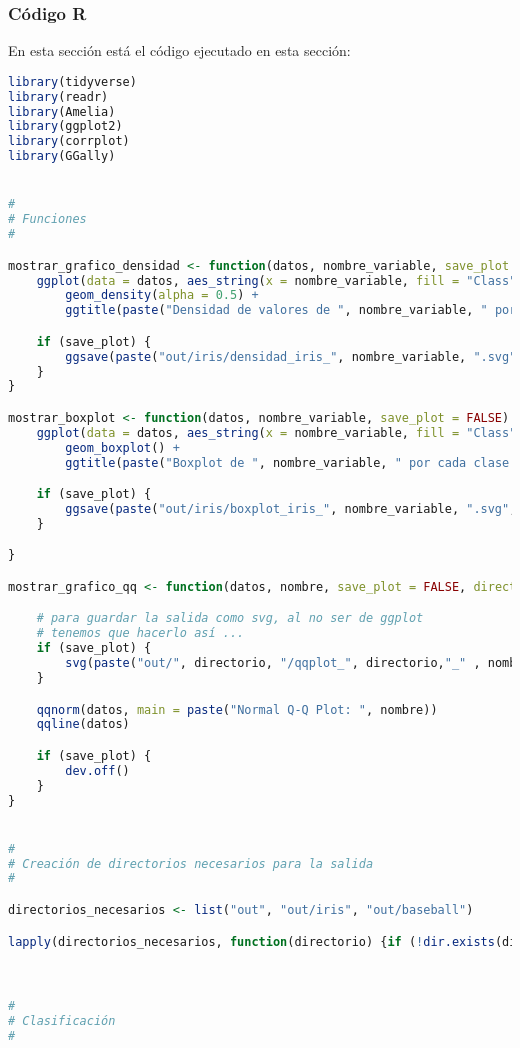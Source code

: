 \subsubsection{Código R}

En esta sección está el código ejecutado en esta sección:

\begin{lstlisting}[language=R]
library(tidyverse)
library(readr)
library(Amelia)
library(ggplot2)
library(corrplot)
library(GGally)


#
# Funciones
#

mostrar_grafico_densidad <- function(datos, nombre_variable, save_plot = FALSE) {
	ggplot(data = datos, aes_string(x = nombre_variable, fill = "Class")) +
		geom_density(alpha = 0.5) +
		ggtitle(paste("Densidad de valores de ", nombre_variable, " por cada clase."))

	if (save_plot) {
		ggsave(paste("out/iris/densidad_iris_", nombre_variable, ".svg", sep = ""), device = svg, width = 1920, height = 1080, units = "px", dpi = 150)
	}
}

mostrar_boxplot <- function(datos, nombre_variable, save_plot = FALSE) {
	ggplot(data = datos, aes_string(x = nombre_variable, fill = "Class")) +
		geom_boxplot() +
		ggtitle(paste("Boxplot de ", nombre_variable, " por cada clase."))

	if (save_plot) {
		ggsave(paste("out/iris/boxplot_iris_", nombre_variable, ".svg", sep = ""), device = svg, width = 1920, height = 1080, units = "px", dpi = 150)
	}

}

mostrar_grafico_qq <- function(datos, nombre, save_plot = FALSE, directorio = "iris") {

	# para guardar la salida como svg, al no ser de ggplot
	# tenemos que hacerlo así ...
	if (save_plot) {
		svg(paste("out/", directorio, "/qqplot_", directorio,"_" , nombre, ".svg", sep = ""))
	}

	qqnorm(datos, main = paste("Normal Q-Q Plot: ", nombre))
	qqline(datos)

	if (save_plot) {
		dev.off()
	}
}


#
# Creación de directorios necesarios para la salida
#

directorios_necesarios <- list("out", "out/iris", "out/baseball")

lapply(directorios_necesarios, function(directorio) {if (!dir.exists(directorio)) dir.create(directorio) })



#
# Clasificación
#



\end{lstlisting}
